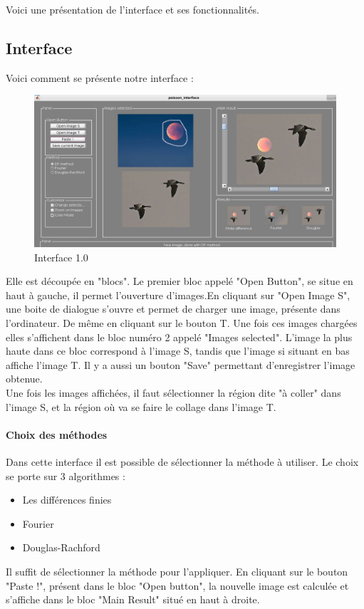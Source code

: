 Voici une présentation de l'interface et ses fonctionnalités.

\subsection{Interface}
Voici comment se présente notre interface : 
\begin{figure}[!h]
    \centering
    \includegraphics[scale = 0.3]{Images/interface.png}
    \caption{Interface 1.0}
\end{figure}{}
Elle est découpée en "blocs". Le premier bloc appelé "Open Button", se situe en haut à gauche, il permet l'ouverture d'images.En cliquant sur "Open Image S", une boite de dialogue s'ouvre et permet de charger une image, présente dans l'ordinateur. De même en cliquant sur le bouton T. Une fois ces images chargées elles s'affichent dans le bloc numéro 2 appelé "Images selected". L'image la plus haute dans ce bloc correspond à l'image S, tandis que l'image si situant en bas affiche l'image T.
Il y a aussi un bouton "Save" permettant d'enregistrer l'image obtenue.\\ 
Une fois les images affichées, il faut sélectionner la région dite "à coller" dans l'image S,  et la région où va se faire le collage dans l'image T.\\

\paragraph{Choix des méthodes}
Dans cette interface il est possible de sélectionner la méthode à utiliser. Le choix se porte sur 3 algorithmes : 
\begin{itemize}
    \item Les différences finies
    \item Fourier 
    \item Douglas-Rachford
\end{itemize}{}
Il suffit de sélectionner la méthode pour l'appliquer.
En cliquant sur le bouton "Paste !", présent dans le bloc "Open button", la nouvelle image est calculée et s'affiche dans le bloc "Main Result" situé en haut à droite. 
